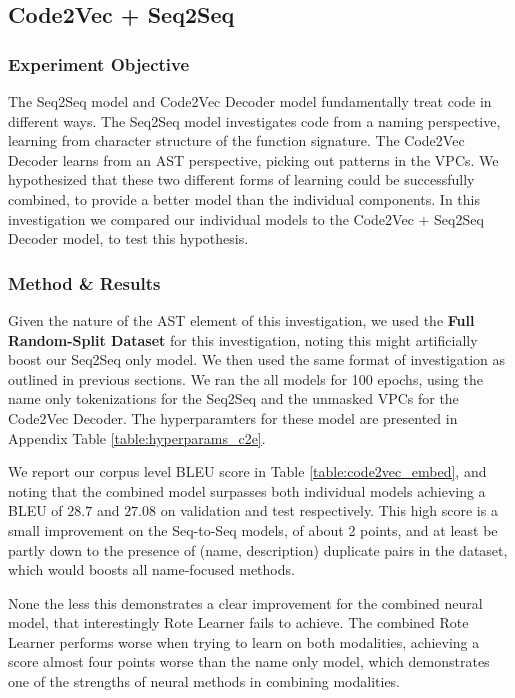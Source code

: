 \subsection{Code2Vec + Seq2Seq } %
\label{sub:combined_code2vec}


\subsubsection{Experiment Objective} %

The Seq2Seq model and Code2Vec Decoder model fundamentally treat code in different ways.
The Seq2Seq model investigates code from a naming perspective, learning from character structure of the function signature.
The Code2Vec Decoder learns from an AST perspective, picking out patterns in the VPCs. 
We hypothesized that these two different forms of learning could be successfully combined, to provide a better model than the individual components.
In this investigation we compared our individual models to the Code2Vec + Seq2Seq Decoder model, to test this hypothesis.

\subsubsection{Method \& Results} %

Given the nature of the AST element of this investigation, we used the \textbf{Full Random-Split Dataset} for this investigation, noting this might artificially boost our Seq2Seq only model. We then used the same format of investigation as outlined in previous sections. 
We ran the all models for 100 epochs, using the name only tokenizations for the Seq2Seq and the unmasked VPCs for the Code2Vec Decoder. The hyperparamters for these model are presented in Appendix Table \ref{table:hyperparams_c2e}. 

We report our corpus level BLEU score in Table \ref{table:code2vec_embed}, and noting that the combined model surpasses both individual models achieving a BLEU of $28.7$ and $27.08$ on validation and test respectively. 
This high score is a small improvement on the Seq-to-Seq models, of about 2 points, and at least be partly down to the presence of (name, description) duplicate pairs in the dataset, which would boosts all name-focused methods.

None the less this demonstrates a clear improvement for the combined neural model, that interestingly Rote Learner fails to achieve. The combined Rote Learner performs worse when trying to learn on both modalities, achieving a score almost four points worse than the name only model, which demonstrates one of the strengths of neural methods in combining modalities.


